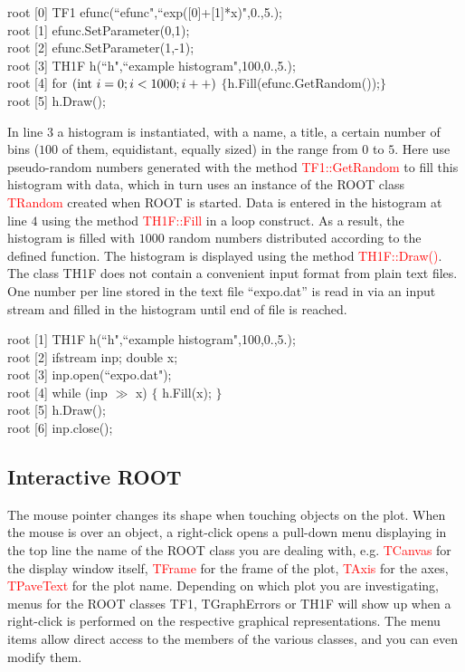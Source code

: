 \documentclass[12pt,a4paper]{article}
\begin{document}
root [0] TF1 efunc(``efunc",``exp([0]+[1]*x)",0.,5.); \\
root [1] efunc.SetParameter(0,1); \\
root [2] efunc.SetParameter(1,-1); \\
root [3] TH1F h(``h",``example histogram",100,0.,5.); \\
root [4] for $({\rm int}~ i=0;i<1000;i++)$ $\{$h.Fill(efunc.GetRandom());$\}$ \\
root [5] h.Draw();

In line $3$ a histogram is instantiated, with a name, a title, a certain number of bins ($100$ of them, equidistant, equally sized) in the range from $0$ to $5$. Here use pseudo-random numbers generated with the method \textcolor{red}{TF1::GetRandom} to fill this histogram with data, which in turn uses an instance of the ROOT class \textcolor{red}{TRandom} created when ROOT is started. Data is entered in the histogram at line $4$ using the method \textcolor{red}{TH1F::Fill} in a loop construct. As a result, the histogram is filled with $1000$ random numbers distributed according to the defined function. The histogram is displayed using the method \textcolor{red}{TH1F::Draw()}. The class TH1F does not contain a convenient input format from plain text files. One number per line stored in the text file “expo.dat” is read in via an input stream and filled in the histogram until end of file is reached.


root [1] TH1F h(``h",``example histogram",100,0.,5.); \\
root [2] ifstream inp; double x; \\
root [3] inp.open(``expo.dat"); \\
root [4] while (inp $\gg$ x) $\{$ h.Fill(x); $\}$ \\
root [5] h.Draw(); \\
root [6] inp.close();

\subsection{Interactive ROOT}
The mouse pointer changes its shape when touching objects on the plot. When the mouse is over an object, a right-click opens a pull-down menu displaying in the top line the name of the ROOT class you are dealing with, e.g. \textcolor{red}{TCanvas} for the display window itself, \textcolor{red}{TFrame} for the frame of the plot, \textcolor{red}{TAxis} for the axes, \textcolor{red}{TPaveText} for the plot name. Depending on which plot you are investigating, menus for the ROOT classes TF1, TGraphErrors or TH1F will show up when a right-click is performed on the respective graphical representations. The menu items allow direct
access to the members of the various classes, and you can even modify them. 
\end{document}
